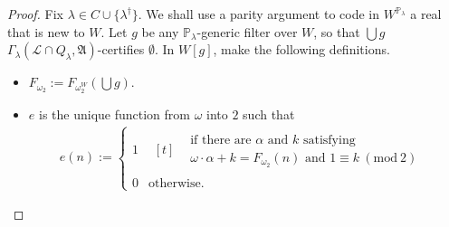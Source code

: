 \documentclass[12pt, twoside]{memoir}
\numberwithin{equation}{section}
\theoremstyle{definition}
\theoremstyle{remark}
\theoremstyle{definition}
\theoremstyle{definition}
\theoremstyle{definition}
\theoremstyle{remark}
\begin{document}
\begin{proof}
Fix $\lambda \in C \cup \{\lambda^{\dagger}\}$. We shall use a parity argument to code in $W^{\mathbb{P}_{\lambda}}$ a real that is new to $W$. Let $g$ be any $\mathbb{P}_{\lambda}$-generic filter over $W$, so that $\bigcup g$ $\Gamma_{\lambda} (\mathcal{L} \cap Q_{\lambda}, \mathfrak{A})$-certifies $\emptyset$. In $W[g]$, make the following definitions.
\begin{itemize}
    \item $F_{\omega_2} := F_{\omega_2^W}(\bigcup g)$. 
    \item $e$ is the unique function from $\omega$ into $2$ such that
    \begin{align*}
        e(n) := 
        \begin{cases}
            1 & \begin{aligned}[t]
            \begin{split}
               & \text{if there are } \alpha \text{ and } k \text{ satisfying} \\ & \omega \cdot \alpha + k = F_{\omega_2}(n) \text{ and } 1 \equiv k \ (\mathrm{mod} \ 2)
            \end{split}
            \end{aligned} \\
            0 & \text{otherwise}.
        \end{cases}
    \end{align*}
\end{itemize}


\end{proof}
\end{document}

